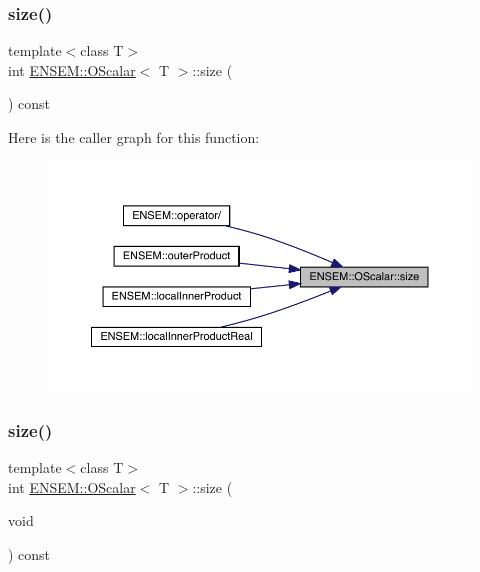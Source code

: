 \mbox{\label{classENSEM_1_1OScalar_a2029adc2feeab03e85a091ab6878fc2d}} 
\subsubsection{\texorpdfstring{size()}{size()}\hspace{0.1cm}{\footnotesize\ttfamily [1/2]}}
{\footnotesize\ttfamily template$<$class T$>$ \\
int \mbox{\hyperlink{classENSEM_1_1OScalar}{E\+N\+S\+E\+M\+::\+O\+Scalar}}$<$ T $>$\+::size (\begin{DoxyParamCaption}{ }\end{DoxyParamCaption}) const\hspace{0.3cm}{\ttfamily [inline]}}

Here is the caller graph for this function\+:\nopagebreak
\begin{figure}[H]
\begin{center}
\leavevmode
\includegraphics[width=350pt]{da/d80/classENSEM_1_1OScalar_a2029adc2feeab03e85a091ab6878fc2d_icgraph}
\end{center}
\end{figure}
\mbox{\label{classENSEM_1_1OScalar_a2029adc2feeab03e85a091ab6878fc2d}} 
\subsubsection{\texorpdfstring{size()}{size()}\hspace{0.1cm}{\footnotesize\ttfamily [2/2]}}
{\footnotesize\ttfamily template$<$class T$>$ \\
int \mbox{\hyperlink{classENSEM_1_1OScalar}{E\+N\+S\+E\+M\+::\+O\+Scalar}}$<$ T $>$\+::size (\begin{DoxyParamCaption}\item[{void}]{ }\end{DoxyParamCaption}) const\hspace{0.3cm}{\ttfamily [inline]}}



